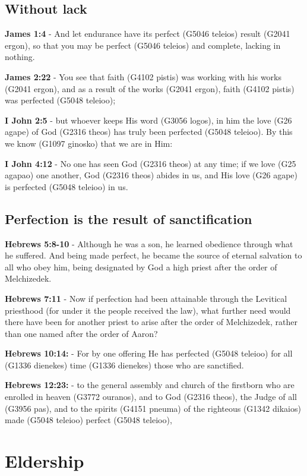 \documentclass[11pt]{article}
\begin{document}
\subsection{Without lack}
\label{sec:orgbedd418}
\textbf{James 1:4} - And let endurance have its perfect (G5046 teleios) result (G2041 ergon), so that you may be perfect (G5046 teleios) and complete, lacking in nothing.

\textbf{James 2:22} - You see that faith (G4102 pistis) was working with his works (G2041 ergon), and as a result of the works (G2041 ergon), faith (G4102 pistis) was perfected (G5048 teleioo);

\textbf{I John 2:5} - but whoever keeps His word (G3056 logos), in him the love (G26 agape) of God (G2316 theos) has truly been perfected (G5048 teleioo). By this we know (G1097 ginosko) that we are in Him:

\textbf{I John 4:12} - No one has seen God (G2316 theos) at any time; if we love (G25 agapao) one another, God (G2316 theos) abides in us, and His love (G26 agape) is perfected (G5048 teleioo) in us.

\subsection{Perfection is the result of sanctification}
\label{sec:org6e5b27d}

\textbf{Hebrews 5:8-10} - Although he was a son, he learned obedience through what he suffered. And being made perfect, he became the source of eternal salvation to all who obey him, being designated by God a high priest after the order of Melchizedek.

\textbf{Hebrews 7:11} - Now if perfection had been attainable through the Levitical priesthood (for under it the people received the law), what further need would there have been for another priest to arise after the order of Melchizedek, rather than one named after the order of Aaron?

\textbf{Hebrews 10:14:} - For by one offering He has perfected (G5048 teleioo) for all (G1336 dienekes) time (G1336 dienekes) those who are sanctified.

\textbf{Hebrews 12:23:} - to the general assembly and church of the firstborn who are enrolled in heaven (G3772 ouranos), and to God (G2316 theos), the Judge of all (G3956 pas), and to the spirits (G4151 pneuma) of the righteous (G1342 dikaios) made (G5048 teleioo) perfect (G5048 teleioo),

\section{Eldership}
\label{sec:org26f2827}
\end{document}
